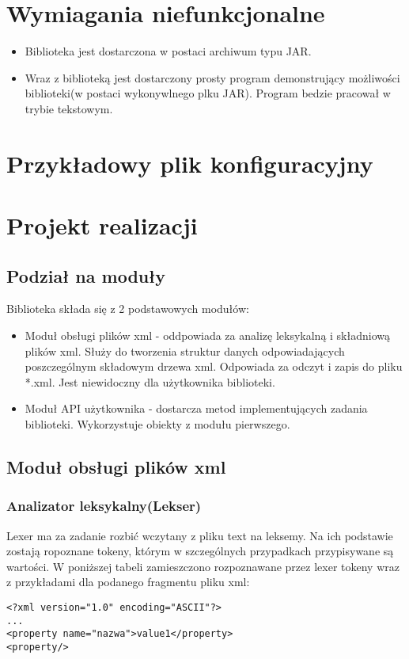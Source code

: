 \documentclass{article}
\begin{document}
\section{Wymiagania niefunkcjonalne}
\begin{itemize}
	\item Biblioteka jest dostarczona w postaci archiwum typu JAR.
	\item Wraz z biblioteką jest dostarczony prosty program demonstrujący możliwości biblioteki(w postaci wykonywlnego plku JAR).
	Program bedzie pracował w trybie tekstowym.
\end{itemize}

\section{Przykładowy plik konfiguracyjny}


\newpage
\section{Projekt realizacji}

\subsection{Podział na moduły}
Biblioteka  składa się z 2 podstawowych modułów:
\begin{itemize}
	\item Moduł obsługi plików xml - oddpowiada za analizę leksykalną i składniową plików xml.
	Służy do tworzenia struktur danych odpowiadających poszczególnym składowym drzewa xml.
	Odpowiada za odczyt i zapis do pliku *.xml. Jest niewidoczny dla użytkownika biblioteki.
	\item Moduł API użytkownika - dostarcza metod implementujących zadania biblioteki.
	Wykorzystuje obiekty z modułu pierwszego.
\end{itemize}

\subsection{Moduł obsługi plików xml}


\subsubsection{Analizator leksykalny(Lekser)}
Lexer ma za zadanie rozbić wczytany z pliku text na leksemy.
Na ich podstawie zostają ropoznane tokeny, którym w szczególnych przypadkach przypisywane są wartości.
W poniższej tabeli zamieszczono rozpoznawane przez lexer tokeny wraz z przykładami dla podanego fragmentu pliku xml: 
\begin{verbatim}
<?xml version="1.0" encoding="ASCII"?>
...
<property name="nazwa">value1</property>
<property/>
\end{verbatim} 
\end{document}
